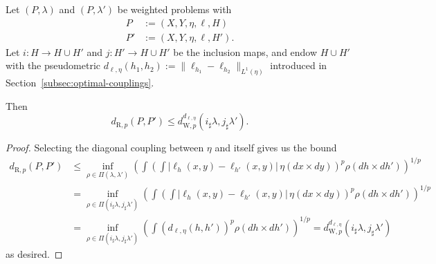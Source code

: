 \documentclass[twoside,11pt]{article}
\newcommand{\dexp}[1][]{d_{\mathrm{R}#1}}
\newcommand{\dWp}[1]{d_{\mathrm{W},#1}}
\begin{document}
\begin{proposition}
    Let $(P,\lambda)$ and $(P,\lambda')$ be weighted problems with
    \begin{align*}
        P &:= (X,Y,\eta,\ell,H)\\
        P' &:= (X,Y,\eta,\ell,H').
    \end{align*}
    Let $i:H\to H\cup H'$ and $j:H'\to H\cup H'$ be the inclusion maps, and endow $H\cup H'$ with the pseudometric $d_{\ell,\eta}(h_1,h_2):= \| \ell_{h_1} - \ell_{h_2}\|_{L^1(\eta)}$ introduced in Section~\ref{subsec:optimal-couplings}.
    
    Then
    \[\dexp[,p](P,P') \leq \dWp{p}^{d_{\ell,\eta}}(i_\sharp \lambda,j_\sharp \lambda').\]
\end{proposition}
\begin{proof}
    Selecting the diagonal coupling between $\eta$ and itself gives us the bound
    \begin{align*}
        \dexp[,p](P,P') &\leq
        \inf_{\rho\in \Pi(\lambda,\lambda')} \left( \int \left(\int
            \big| \ell_h(x,y) - \ell_{h'}(x,y)\big|\, \eta(dx{\times}dy)
        \right)^p \rho(dh{\times}dh')\right)^{1/p}
        \\ &
        =
        \inf_{\rho\in \Pi(i_\sharp \lambda,j_\sharp \lambda')} \left( \int \left(\int
            \big| \ell_h(x,y) - \ell_{h'}(x,y)\big|\, \eta(dx{\times}dy)
        \right)^p \rho(dh{\times}dh')\right)^{1/p}
        \\ &
        = \inf_{\rho\in \Pi(i_\sharp \lambda,j_\sharp \lambda')} \left(\int \left(d_{\ell,\eta}(h,h')\right)^p \rho(dh{\times}dh')\right)^{1/p}
        =\dWp{p}^{d_{\ell,\eta}}(i_\sharp \lambda,j_\sharp \lambda')
    \end{align*}
    as desired.
\end{proof}
\end{document}
